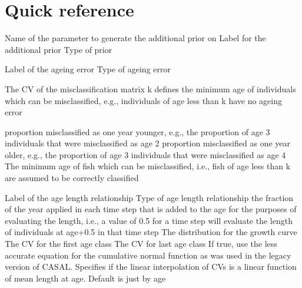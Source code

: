 \section{Quick reference\label{sec:quick-reference}}

\par
{} {Name of the parameter to generate the additional prior on}
 {Label for the additional prior}
 {Type of prior}

\par\par
{} {Label of the ageing error}
 {Type of ageing error}
\par\textbf{}\par
\par\textbf{}\par
\par\textbf{}\par
{} {The CV of the misclassification matrix}
 {k defines the minimum age of individuals which can be misclassified, e.g., individuals of age less than k have no ageing error}
\par\textbf{}\par
{} {proportion misclassified as one year younger, e.g., the proportion of age 3 individuals that were misclassified as age 2}
 {proportion misclassified as one year older, e.g., the proportion of age 3 individuals that were misclassified as age 4}
 {The minimum age of fish which can be misclassified, i.e., fish of age less than k are assumed to be correctly classified}

\par\par
{} {Label of the age length relationship}
 {Type of age length relationship}
 {the fraction of the year applied in each time step that is added to the age for the purposes of evaluating the length, i.e., a value of 0.5 for a time step will evaluate the length of individuals at age+0.5 in that time step}
 {The distribution for the growth curve}
 {The CV for the first age class}
 {The CV for last age class}
 {If true, use the less accurate equation for the cumulative normal function as was used in the legacy version of CASAL.}
 {Specifies if the linear interpolation of CVs is a linear function of mean length at age. Default is just by age}

